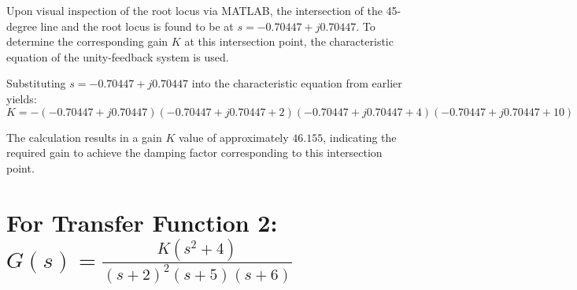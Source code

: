 \documentclass[11pt]{article}
\begin{document}
\begin{enumerate}
Upon visual inspection of the root locus via MATLAB, the intersection of the 45-degree line and the root locus is found to be at \( s = -0.70447 + j0.70447 \). To determine the corresponding gain \( K \) at this intersection point, the characteristic equation of the unity-feedback system is used.

Substituting \( s = -0.70447 + j0.70447 \) into the characteristic equation from earlier yields:
\[ K = -(-0.70447 + j0.70447)\left(-0.70447 + j0.70447 + 2\right)\left(-0.70447 + j0.70447 + 4\right)\left(-0.70447 + j0.70447 + 10\right) \]

The calculation results in a gain \( K \) value of approximately \( 46.155 \), indicating the required gain to achieve the damping factor corresponding to this intersection point.

\end{enumerate}
\newpage

\section*{For Transfer Function 2: \( G(s) = \frac{K(s^2+4)}{(s+2)^2(s+5)(s+6)} \)}
\end{document}
